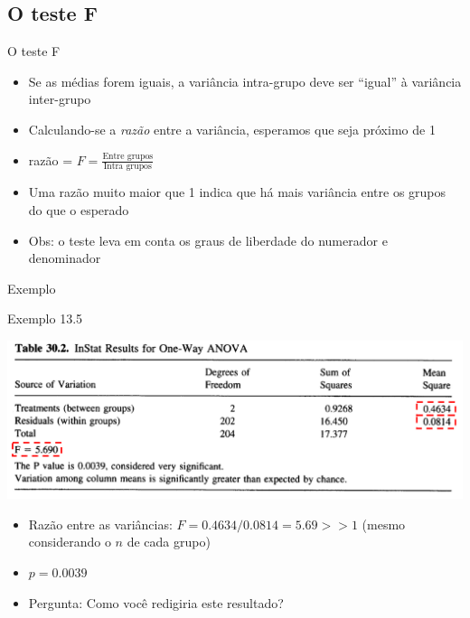 \documentclass{beamer}
\begin{document}



\subsection{O teste F}

\begin{frame}{O teste F}
  \begin{itemize}
  \item Se as médias forem iguais, a variância intra-grupo deve ser ``igual'' à variância inter-grupo
  \item Calculando-se a {\em razão} entre a variância, esperamos que seja próximo de 1
  \item razão = $F = \frac{\text{Entre grupos}}{\text{Intra grupos}}$
  \item Uma razão muito maior que 1 indica que há mais variância entre os grupos do que o esperado
  \item Obs: o teste leva em conta os graus de liberdade do numerador e denominador
  \end{itemize}
\end{frame}

\begin{frame}{Exemplo}
  \begin{exampleblock}{Exemplo 13.5}
    \begin{center}
      \includegraphics[width=.6\textwidth]{Cap13-30/exemplo13_5-3}
    \end{center}
  \begin{itemize}
  \item Razão entre as variâncias: $F = 0.4634/0.0814 = 5.69 >> 1$ {\tiny (mesmo considerando o $n$ de cada grupo)}
  \item $p=0.0039$
  \item Pergunta:  Como você redigiria este resultado?
  \end{itemize}
  \end{exampleblock}
\end{frame}
\end{document}
